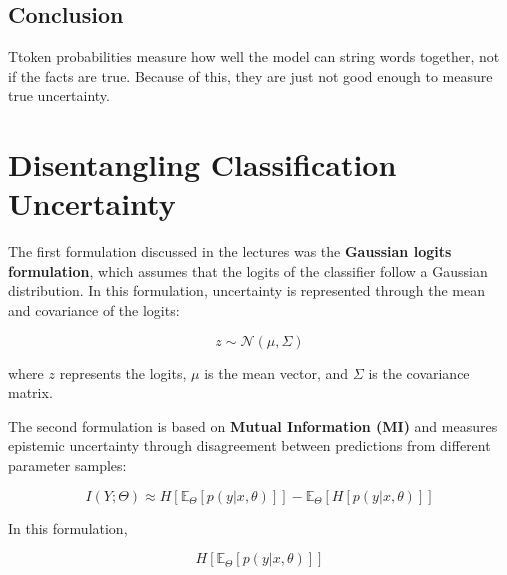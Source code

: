 \documentclass{article}
\begin{document}
\subsection*{Conclusion}

Ttoken probabilities measure how well the model can string words together, not if the facts are true. Because of this, they are just not good enough to measure true uncertainty.


\newpage


\section{Disentangling Classification Uncertainty}


The first formulation discussed in the lectures was the \textbf{Gaussian logits formulation}, which assumes that the logits of the classifier follow a Gaussian distribution. In this formulation, uncertainty is represented through the mean and covariance of the logits:

\begin{equation*}
z \sim \mathcal{N}(\mu, \Sigma)
\end{equation*}

where $z$ represents the logits, $\mu$ is the mean vector, and $\Sigma$ is the covariance matrix.

The second formulation is based on \textbf{Mutual Information (MI)} and measures epistemic uncertainty through disagreement between predictions from different parameter samples:

\begin{equation*}
    I(Y;\Theta)
    \approx
    H\left[\mathbb{E}_{\Theta}[p(y|x,\theta)]\right]
    -
    \mathbb{E}_{\Theta}\left[H[p(y|x,\theta)]\right]
\end{equation*}

In this formulation,

\begin{equation*}
    H\left[\mathbb{E}_{\Theta}[p(y|x,\theta)]\right]
\end{equation*}
\end{document}
